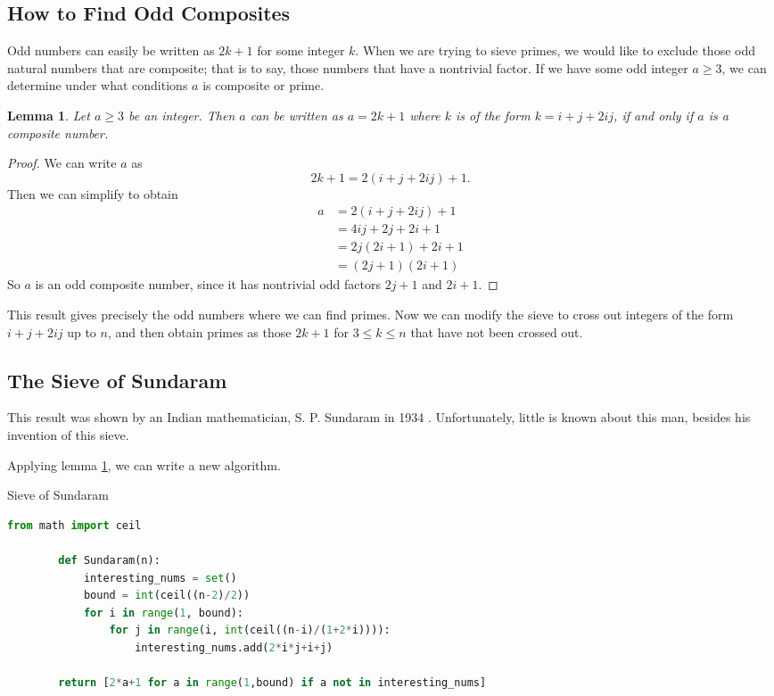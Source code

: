 \documentclass{amsart}
\newtheorem{lem}{Lemma}
\theoremstyle{definition}
\theoremstyle{case}
\begin{document}
	\subsection{How to Find Odd Composites}
	
	Odd numbers can easily be written as $2k+1$ for some integer $k$. When we are trying to sieve primes, we would like to exclude those odd natural numbers that are composite; that is to say, those numbers that have a nontrivial factor. If we have some odd integer $a\geq3$, we can determine under what conditions $a$ is composite or prime.
	
	\begin{lem}\label{ijstuff}
		Let $a\geq3$ be an integer. Then $a$ can be written as $a = 2k+1$ where $k$ is of the form $k=i+j+2ij$, if and only if $a$ is a composite number.
	\end{lem}
	\begin{proof}
		We can write $a$ as
		$$ 2k + 1 = 2(i+j+2ij) + 1 . $$
		Then we can simplify to obtain
		\begin{equation*}
		\begin{split}
		a &= 2(i+j+2ij) + 1 \\
		  &= 4ij + 2j + 2i + 1 \\
		  &= 2j(2i+1) + 2i + 1 \\
		  &= (2j+1)(2i+1)
		\end{split}
		\end{equation*}
		So $a$ is an odd composite number, since it has nontrivial odd factors $2j+1$ and $2i+1$.
	\end{proof}

	This result gives precisely the odd numbers where we can find primes. Now we can modify the sieve to cross out integers of the form $i+j+2ij$ up to $n$, and then obtain primes as those $2k+1$ for $3 \leq k \leq n$ that have not been crossed out.
	
	\subsection{The Sieve of Sundaram}
	
	This result was shown by an Indian mathematician, S. P. Sundaram in 1934 \cite[p.~158]{ogilvyanderson}. Unfortunately, little is known about this man, besides his invention of this sieve. 
	
	Applying lemma \ref{ijstuff}, we can write a new algorithm.

	\begin{Algorithm}[H]\caption{Sieve of Sundaram}
		\begin{lstlisting}[language=Python]
        from math import ceil
        
        def Sundaram(n):
            interesting_nums = set()
            bound = int(ceil((n-2)/2))
            for i in range(1, bound):
                for j in range(i, int(ceil((n-i)/(1+2*i)))):
                    interesting_nums.add(2*i*j+i+j)
        
        return [2*a+1 for a in range(1,bound) if a not in interesting_nums]
        
		\end{lstlisting}
	\end{Algorithm}
\end{document}
